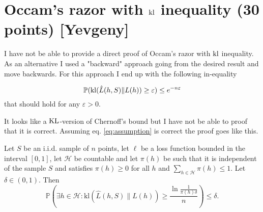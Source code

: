 \section{Occam's razor with \texorpdfstring{$\operatorname{kl}$}{kl} inequality (30 points) [Yevgeny]}

I have not be able to provide a direct proof of Occam's razor with $\operatorname{kl}$ inequality.
As an alternative I used a "backward" approach going from the desired result and move backwards. For this approach I end up with the following in-equality

\begin{equation}\label{eq:assumption}
\mathbb{P}(\operatorname{kl}(\hat{L}(h,S)\|L(h)) \geq \varepsilon) \leq e^{-n\varepsilon}
\end{equation}
that should hold for any $\varepsilon > 0$. 

It looks like a $\operatorname{KL}$-version of Chernoff's bound but I have not be able to proof that it is correct. Assuming eq. \ref{eq:assumption} is correct the proof goes like this.


\begin{theorem}
Let $S$ be an i.i.d. sample of $n$ points, let $\ell$ be a loss function bounded in the interval $[0, 1]$, let $\mathcal{H}$ be countable and let $\pi(h)$ be such that it is independent of the sample $S$ and satisfies $\pi(h) \geq 0$ for all $h$ and $\sum_{h\in\mathcal{H}} \pi(h) \leq 1$. Let $\delta \in (0,1)$. Then
\begin{equation*}
\mathbb{P}\left(\exists h \in \mathcal{H} : \text{kl}(\hat{L}(h, S)\|L(h)) \geq \frac{\ln \frac{1}{\pi(h)\delta}}{n}\right) \leq \delta.
\end{equation*}
\end{theorem}

